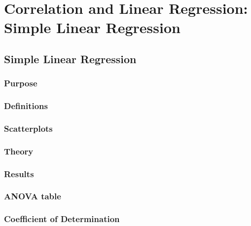 \chapter{Correlation and Linear Regression: Simple Linear Regression}  %

\section{Simple Linear Regression}  %
    \subsection{Purpose}  %
    \subsection{Definitions}  %
    \subsection{Scatterplots}  %
    \subsection{Theory}  %
    \subsection{Results}  %
    \subsection{ANOVA table}  %
    \subsection{Coefficient of Determination}  %

